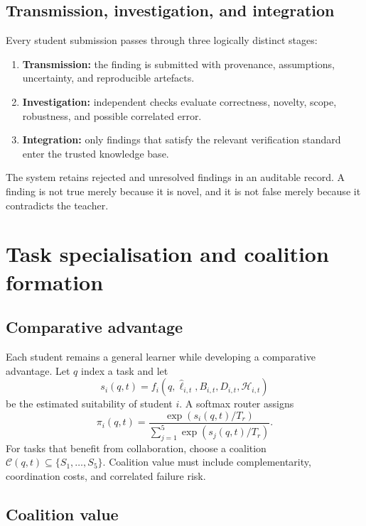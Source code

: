 \documentclass[11pt,a4paper]{article}
\begin{document}
\subsection{Transmission, investigation, and integration}

Every student submission passes through three logically distinct stages:
\begin{enumerate}
\item \textbf{Transmission:} the finding is submitted with provenance, assumptions, uncertainty, and reproducible artefacts.
\item \textbf{Investigation:} independent checks evaluate correctness, novelty, scope, robustness, and possible correlated error.
\item \textbf{Integration:} only findings that satisfy the relevant verification standard enter the trusted knowledge base.
\end{enumerate}
The system retains rejected and unresolved findings in an auditable record. A finding is not true merely because it is novel, and it is not false merely because it contradicts the teacher.

\section{Task specialisation and coalition formation}

\subsection{Comparative advantage}

Each student remains a general learner while developing a comparative advantage. Let \(q\) index a task and let
\begin{equation}
s_i(q,t)
=
f_i(q,\widehat{\boldsymbol{\ell}}_{i,t},B_{i,t},D_{i,t},\mathcal H_{i,t})
\end{equation}
be the estimated suitability of student \(i\). A softmax router assigns
\begin{equation}
\pi_i(q,t)
=
\frac{\exp(s_i(q,t)/T_r)}
{\sum_{j=1}^{5}\exp(s_j(q,t)/T_r)}.
\end{equation}
For tasks that benefit from collaboration, choose a coalition \(\mathcal C(q,t)\subseteq\{S_1,\ldots,S_5\}\). Coalition value must include complementarity, coordination costs, and correlated failure risk.

\subsection{Coalition value}
\end{document}
